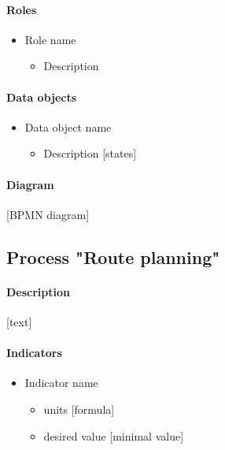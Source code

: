 \documentclass[11pt,a4paper]{article}
\begin{document}
\paragraph{Roles}

\begin{itemize}
    \item Role name
    \begin{itemize}
        \item Description
    \end{itemize}
\end{itemize}

\paragraph{Data objects}

\begin{itemize}
    \item Data object name
    \begin{itemize}
        \item Description [states]
    \end{itemize}
\end{itemize}

\paragraph{Diagram}

[BPMN diagram]

\subsection{Process "Route planning"}

\paragraph{Description}

[text]

\paragraph{Indicators}

\begin{itemize}
    \item Indicator name
    \begin{itemize}
        \item units [formula]
        \item desired value [minimal value]
    \end{itemize}
\end{itemize}
\end{document}
